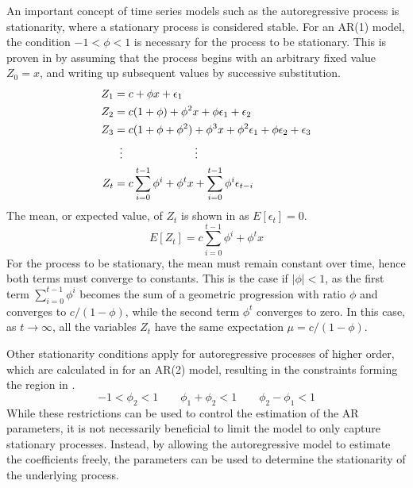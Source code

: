         An important concept of time series models such as the autoregressive process is stationarity, where a stationary process is considered stable. For an AR(1) model, the condition $-1<\phi<1$ is necessary for the process to be stationary. This is proven in \cite{alonso2012autoregressive} by assuming that the process begins with an arbitrary fixed value $Z_0=x$, and writing up subsequent values by successive substitution.
        \begin{equation}
            \begin{split}
                Z_1 & = c + \phi x + \epsilon_1 \\
                Z_2 & = c(1+\phi) + \phi^2x+\phi\epsilon_1 + \epsilon_2 \\
                Z_3 & = c(1+\phi+\phi^2) + \phi^3x + \phi^2\epsilon_1 + \phi\epsilon_2 + \epsilon_3 \\
                & \vdotswithin{=}\qquad\qquad\qquad \vdots \\
                Z_t & = c\sum_{i=0}^{t-1}\phi^i + \phi^tx + \sum_{i=0}^{t-1}\phi^i\epsilon_{t-i}
            \end{split}
        \end{equation}
        The mean, or expected value, of $Z_t$ is shown in  as $E[\epsilon_t]=0$.
        \begin{equation}\label{eq:ar-expectation}
            E[Z_t] = c\sum_{i=0}^{t-1}\phi^i+\phi^tx
        \end{equation}
        For the process to be stationary, the mean must remain constant over time, hence both terms must converge to constants. This is the case if $|\phi|<1$, as the first term $\sum_{i=0}^{t-1}\phi^i$ becomes the sum of a geometric progression with ratio $\phi$ and converges to $c/(1-\phi)$, while the second term $\phi^t$ converges to zero. In this case, as $t\rightarrow\infty$, all the variables $Z_t$ have the same expectation $\mu=c/(1-\phi)$.
        
        Other stationarity conditions apply for autoregressive processes of higher order, which are calculated in \cite{giles2012stationarity} for an AR(2) model, resulting in the constraints forming the region in .
        \begin{equation}\label{eq:ar-2-constraints}
            -1<\phi_2<1 \qquad \phi_1+\phi_2<1 \qquad \phi_2-\phi_1<1
        \end{equation}
        While these restrictions can be used to control the estimation of the AR parameters, it is not necessarily beneficial to limit the model to only capture stationary processes. Instead, by allowing the autoregressive model to estimate the coefficients freely, the parameters can be used to determine the stationarity of the underlying process.
        
